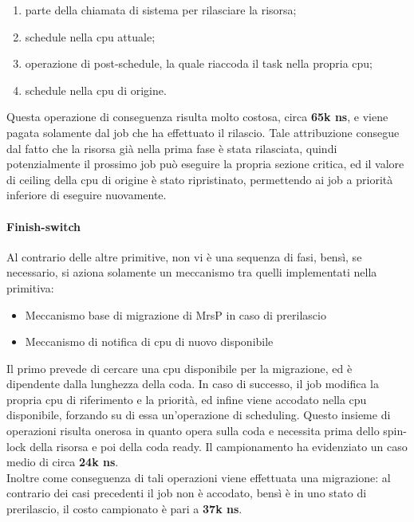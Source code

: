\begin{enumerate}
	\item parte della chiamata di sistema per rilasciare la risorsa;
	\item schedule nella cpu attuale;
	\item operazione di post-schedule, la quale riaccoda il task nella propria cpu;
	\item schedule nella cpu di origine.
\end{enumerate}

\noindent Questa operazione di conseguenza risulta molto costosa, circa \textbf{65k ns}, e viene pagata solamente dal job che ha effettuato il rilascio. Tale attribuzione consegue dal fatto che la risorsa già nella prima fase è stata rilasciata, quindi potenzialmente il prossimo job può eseguire la propria sezione critica, ed il valore di ceiling della cpu di origine è stato ripristinato, permettendo ai job a priorità inferiore di eseguire nuovamente.\\

\paragraph{Finish-switch} Al contrario delle altre primitive, non vi è una sequenza di fasi, bensì, se necessario, si aziona solamente un meccanismo tra quelli implementati nella primitiva:

\begin{itemize}
	\item Meccanismo base di migrazione di MrsP in caso di prerilascio
	\item Meccanismo di notifica di cpu di nuovo disponibile
\end{itemize}

\noindent Il primo prevede di cercare una cpu disponibile per la migrazione, ed è dipendente dalla lunghezza della coda. In caso di successo, il job modifica la propria cpu di riferimento e la priorità, ed infine viene accodato nella cpu disponibile, forzando su di essa un'operazione di scheduling. Questo insieme di operazioni risulta onerosa in quanto opera sulla coda e necessita prima dello spin-lock della risorsa e poi della coda ready. Il campionamento ha evidenziato un caso medio di circa \textbf{24k ns}.\\

\noindent Inoltre come conseguenza di tali operazioni viene effettuata una migrazione: al contrario dei casi precedenti il job non è accodato, bensì è in uno stato di prerilascio, il costo campionato è pari a \textbf{37k ns}.\\

